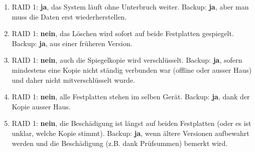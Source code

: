 \begin{myexercise}
    \begin{myanswer}
        \begin{enumerate}[label=(\alph*)]
            \item \acrshort{RAID} 1: \textbf{ja}, das System läuft ohne Unterbruch weiter. Backup: \textbf{ja}, aber man muss die Daten erst wiederherstellen.
            \item \acrshort{RAID} 1: \textbf{nein}, das Löschen wird sofort auf beide Festplatten gespiegelt. Backup: \textbf{ja}, aus einer früheren Version.
            \item \acrshort{RAID} 1: \textbf{nein}, auch die Spiegelkopie wird verschlüsselt. Backup: \textbf{ja}, sofern mindestens eine Kopie nicht ständig verbunden war (offline oder ausser Haus) und daher nicht mitverschlüsselt wurde.
            \item \acrshort{RAID} 1: \textbf{nein}, alle Festplatten stehen im selben Gerät. Backup: \textbf{ja}, dank der Kopie ausser Haus.
            \item \acrshort{RAID} 1: \textbf{nein}, die Beschädigung ist längst auf beiden Festplatten (oder es ist unklar, welche Kopie stimmt). Backup: \textbf{ja}, wenn ältere Versionen aufbewahrt werden und die Beschädigung (z.B. dank Prüfsummen) bemerkt wird.
        \end{enumerate}
    \end{myanswer}
\end{myexercise}

